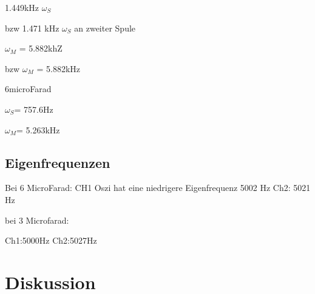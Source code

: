 \documentclass{article}
\begin{document}
1.449kHz $\omega_S$

bzw 1.471 kHz $\omega_S$ an zweiter Spule

$\omega_M$ = 5.882khZ

bzw $\omega_M$ = 5.882kHz

6microFarad

$\omega_S$= 757.6Hz

$\omega_M$= 5.263kHz

\subsection{Eigenfrequenzen}
Bei 6 MicroFarad:
CH1 Oszi hat eine niedrigere Eigenfrequenz
5002 Hz
Ch2:
5021 Hz

bei 3 Microfarad:

Ch1:5000Hz
Ch2:5027Hz


\section{Diskussion}		
																								
\end{document}
